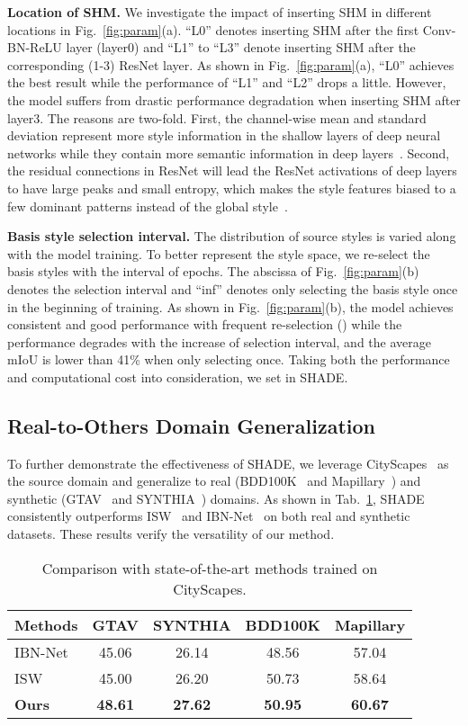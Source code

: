 \documentclass[runningheads]{llncs}
\newcommand{\ours}{SHADE\xspace}
\begin{document}
\noindent\textbf{Location of SHM.}
We investigate the impact of inserting SHM in different locations in Fig.~\ref{fig:param}(a). ``L0'' denotes inserting SHM after the first Conv-BN-ReLU layer (layer0) and ``L1'' to ``L3'' denote inserting SHM after the corresponding (1-3) ResNet layer. As shown in Fig.~\ref{fig:param}(a), ``L0'' achieves the best result while the performance of ``L1'' and ``L2'' drops a little. However, the model suffers from drastic performance degradation when inserting SHM after layer3. The reasons are two-fold. First, the channel-wise mean and standard deviation represent more style information in the shallow layers of deep neural networks while they contain more semantic information in deep layers~\cite{adain,dumoulin2016learned}. Second, the residual connections in ResNet will lead the ResNet activations of deep layers to have large peaks and small entropy, which makes the style features biased to a few dominant patterns instead of the global style~\cite{wang2021rethinking}.


\noindent\textbf{Basis style selection interval.}
The distribution of source styles is varied along with the model training. To better represent the style space, we re-select the basis styles with the interval of  epochs. 
The abscissa of Fig.~\ref{fig:param}(b) denotes the selection interval  and ``inf'' denotes only selecting the basis style once in the beginning of training.
As shown in Fig.~\ref{fig:param}(b), the model achieves consistent and good performance with frequent re-selection () while the performance degrades with the increase of selection interval, and the average mIoU is lower than 41\% when only selecting once. Taking both the performance and computational cost into consideration, we set  in \ours.


\subsection{Real-to-Others Domain Generalization}
To further demonstrate the effectiveness of \ours, we leverage CityScapes~\cite{cityscapes} as the source domain and generalize to real (BDD100K~\cite{bdd} and Mapillary~\cite{mapillary}) and synthetic (GTAV~\cite{gtav} and SYNTHIA~\cite{synthia}) domains.
As shown in Tab.~\ref{tab:city}, \ours consistently outperforms ISW~\cite{robustnet} and IBN-Net~\cite{ibn} on both real and synthetic datasets. These results verify the versatility of our method.

\begin{table}[t]
\caption{Comparison with state-of-the-art methods trained on CityScapes.}
\footnotesize
    \centering
    \begin{tabular}{l|cccc}
    \toprule
      Methods & GTAV & SYNTHIA & BDD100K & Mapillary \\
    \midrule
    IBN-Net~\cite{ibn} & 45.06 & 26.14 & 48.56 & 57.04 \\
    ISW~\cite{robustnet}  & 45.00 & 26.20 & 50.73 & 58.64 \\
    \textbf{Ours}  & \textbf{48.61} & \textbf{27.62} & \textbf{50.95} & \textbf{60.67} \\
    \bottomrule
    \end{tabular}
    \label{tab:city}
\end{table}
\end{document}
